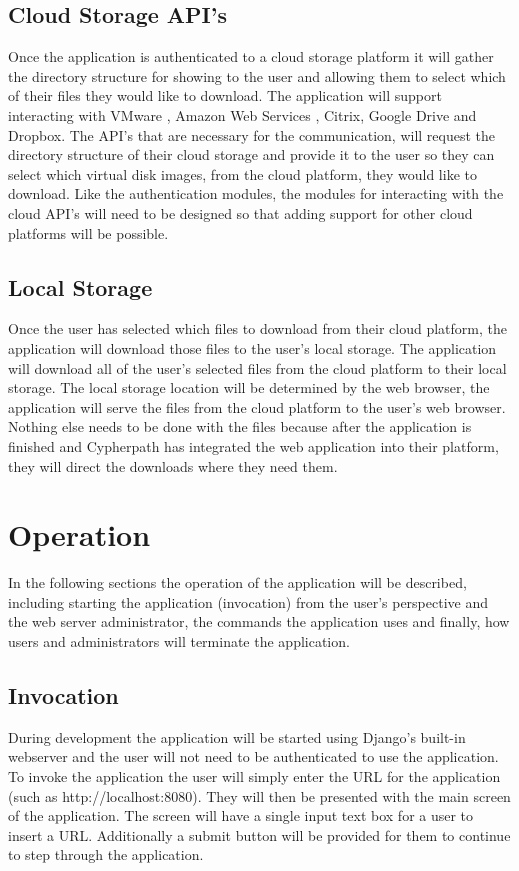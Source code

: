 \documentclass{article}
\begin{document}
        \subsection{Cloud Storage API's}
        Once the application is authenticated to a cloud storage platform it will gather the directory structure for showing to the user and allowing them to select
        which of their files they would like to download. The application will support interacting with VMware \cite{vmware}, Amazon Web Services \cite{aws}, Citrix, Google Drive and Dropbox. The API's
        that are necessary for the communication, will request the directory structure of their cloud storage and provide it to the user so they can select which virtual disk
        images, from the cloud platform, they would like to download. Like the authentication modules, the modules
        for interacting with the cloud API's will need to be designed so that adding support for other cloud platforms will be possible.


        \subsection{Local Storage}
        Once the user has selected which files to download from their cloud platform, the application will download those
        files to the user's local storage. The application will download all of the user's selected files from the cloud platform to their local storage.
        The local storage location will be determined by the web browser, the application will serve the files from the cloud platform to the user's web browser. Nothing else 
        needs to be done with the files because after the application is finished and Cypherpath has integrated the web application into 
        their platform, they will direct the downloads where they need them.


    \section{Operation}
    In the following sections the operation of the application will be described, including starting the application
    (invocation) from the user's perspective and the web server administrator, the commands the application uses and finally, how users and administrators will terminate the application.

        \subsection{Invocation}
        During development the application will be started using Django's built-in webserver and
        the user will not need to be authenticated to use the application. To invoke the application the user will simply enter the URL for the application (such as http://localhost:8080).
        They will then be presented with the main screen of the application. The screen will have a single input text box for a user to insert a URL. Additionally 
        a submit button will be provided for them to continue to step through the application. 
\end{document}
